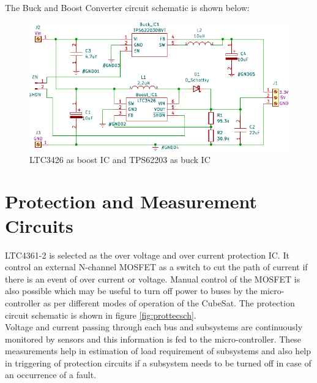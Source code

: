The Buck and Boost Converter circuit schematic is shown below:
\begin{figure}[ht]
	\centering
	\includegraphics[width=\columnwidth]{1.pdf}
	\caption{LTC3426 as boost IC and TPS62203 as buck IC}
	\label{fig:bubo}
\end{figure}



\section[Protection Circuits]{Protection and Measurement Circuits}


LTC4361-2 is selected as the over voltage and over current protection IC. It control an external N-channel MOSFET as a switch to cut the path of current if there is an event of over current or voltage. Manual control of the MOSFET is also possible which may be useful to turn off power to buses by the micro-controller as per different modes of operation of the CubeSat.
The protection circuit schematic is shown in figure \ref{fig:prottecsch}.
\\

 Voltage and current passing through each bus and subsystems are continuously monitored by sensors and this information is fed to the micro-controller. These measurements help in estimation of load requirement of subsystems and also help in triggering of protection circuits if a subsystem needs to be turned off in case of an occurrence of a fault. 
 \\
 
